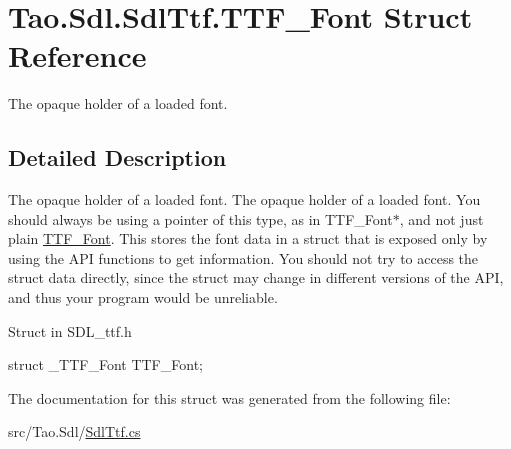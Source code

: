 \hypertarget{struct_tao_1_1_sdl_1_1_sdl_ttf_1_1_t_t_f___font}{
\section{Tao.Sdl.SdlTtf.TTF\_\-Font Struct Reference}
\label{struct_tao_1_1_sdl_1_1_sdl_ttf_1_1_t_t_f___font}
}


The opaque holder of a loaded font.  




\subsection{Detailed Description}
The opaque holder of a loaded font. The opaque holder of a loaded font. You should always be using a pointer of this type, as in TTF\_\-Font$\ast$, and not just plain \hyperlink{struct_tao_1_1_sdl_1_1_sdl_ttf_1_1_t_t_f___font}{TTF\_\-Font}. This stores the font data in a struct that is exposed only by using the API functions to get information. You should not try to access the struct data directly, since the struct may change in different versions of the API, and thus your program would be unreliable. 

Struct in SDL\_\-ttf.h 
\begin{DoxyCode}
struct _TTF_Font TTF_Font;
\end{DoxyCode}
 

The documentation for this struct was generated from the following file:\begin{DoxyCompactItemize}
\item 
src/Tao.Sdl/\hyperlink{_sdl_ttf_8cs}{SdlTtf.cs}\end{DoxyCompactItemize}

